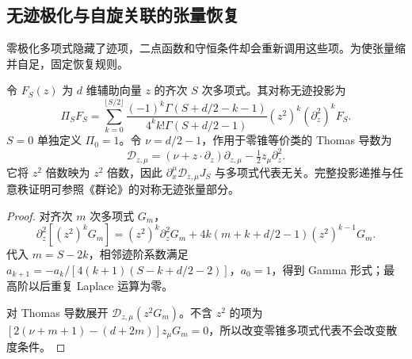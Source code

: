 \subsection{无迹极化与自旋关联的张量恢复}

零极化多项式隐藏了迹项，二点函数和守恒条件却会重新调用这些项。为使张量缩并自足，固定恢复规则。

\begin{definition}[调和投影与零锥导数]
令 $F_S(z)$ 为 $d$ 维辅助向量 $z$ 的齐次 $S$ 次多项式。其对称无迹投影为
\begin{equation}\label{eq:ghs-r4-stf-projector}
 \Pi_SF_S=\sum_{k=0}^{\lfloor S/2\rfloor}
 \frac{(-1)^k\Gamma(S+d/2-k-1)}{4^kk!\Gamma(S+d/2-1)}
 (z^2)^k(\partial_z^2)^kF_S.
\end{equation}
$S=0$ 单独定义 $\Pi_0=1$。令 $\nu=d/2-1$，作用于零锥等价类的 Thomas 导数为
\[
 \mathcal D_{z,\mu}=(\nu+z\cdot\partial_z)\partial_{z,\mu}
 -\tfrac12z_\mu\partial_z^2.
\]
它将 $z^2$ 倍数映为 $z^2$ 倍数，因此 $\partial_x^\mu\mathcal D_{z,\mu}J_S$ 与多项式代表无关。完整投影递推与任意秩证明可参照《群论》的对称无迹张量部分。
\end{definition}
\begin{proof}
对齐次 $m$ 次多项式 $G_m$，
\[
 \partial_z^2[(z^2)^kG_m]=(z^2)^k\partial_z^2G_m
 +4k(m+k+d/2-1)(z^2)^{k-1}G_m.
\]
代入 $m=S-2k$，相邻迹阶系数满足
$a_{k+1}=-a_k/[4(k+1)(S-k+d/2-2)]$，$a_0=1$，得到 Gamma 形式；最高阶以后重复 Laplace 运算为零。

对 Thomas 导数展开 $\mathcal D_{z,\mu}(z^2G_m)$。不含 $z^2$ 的项为
$[2(\nu+m+1)-(d+2m)]z_\mu G_m=0$，所以改变零锥多项式代表不会改变散度条件。
\end{proof}
